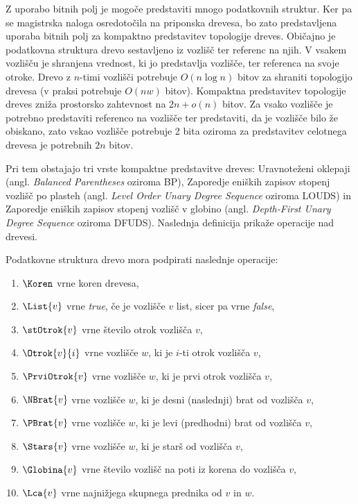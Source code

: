 Z uporabo bitnih polj je mogoče predstaviti mnogo podatkovnih struktur. Ker pa se magistrska naloga osredotočila na priponska drevesa, bo zato predstavljena uporaba bitnih polj za kompaktno predstavitev topologije dreves. Običajno je podatkovna struktura drevo sestavljeno iz vozlišč ter referenc  na njih. V vsakem vozlišču je shranjena vrednost, ki jo predstavlja vozlišče, ter referenca na svoje otroke. Drevo z $n$-timi vozlišči potrebuje $O(n\log{n})$ bitov za shraniti topologijo drevesa (v praksi potrebuje $O(nw)$ bitov). Kompaktna predstavitev topologije dreves zniža prostorsko zahtevnost na $2n+o(n)$ bitov. Za vsako vozlišče je potrebno predstaviti referenco na vozlišče ter predstaviti, da je vozlišče bilo že obiskano, zato vskao vozlišče potrebuje 2 bita oziroma za predstavitev celotnega drevesa je potrebnih $2n$ bitov.

Pri tem obstajajo tri vrste kompaktne predstavitve dreves: Uravnoteženi oklepaji (angl. \textit{Balanced Parentheses} oziroma BP), Zaporedje eniških zapisov stopenj vozlišč po plasteh (angl. \textit{Level Order Unary Degree Sequence} oziroma LOUDS) in Zaporedje eniških zapisov stopenj vozlišč v globino (angl. \textit{Depth-First Unary Degree Sequence} oziroma DFUDS). Naslednja definicija prikaže operacije nad drevesi.


\begin{defi}\label{def:drevo}
    Podatkovne struktura drevo mora podpirati naslednje operacije:
    \begin{enumerate}
        \item $\Koren$ vrne koren drevesa,
        \item $\List{v}$ vrne \textit{true}, če je vozlišče $v$ list, sicer pa vrne \textit{false},
        \item $\stOtrok{v}$ vrne število otrok vozlišča $v$,
        \item $\Otrok{v}{i}$ vrne vozlišče $w$, ki je $i$-ti otrok vozlišča $v$,
        \item $\PrviOtrok{v}$ vrne vozlišče $w$, ki je prvi otrok vozlišča $v$,
        \item $\NBrat{v}$ vrne vozlišče $w$, ki je desni (naslednji) brat od vozlišča $v$,
        \item $\PBrat{v}$ vrne vozlišče $w$, ki je levi (predhodni) brat od vozlišča $v$,
        \item $\Stars{v}$ vrne vozlišče $w$, ki je starš od vozlišča $v$,
        \item $\Globina{v}$ vrne število vozlišč na poti iz korena do vozlišča $v$, %
        \item $\Lca{v}$ vrne najnižjega skupnega prednika od $v$ in $w$.
    \end{enumerate}
\end{defi}


